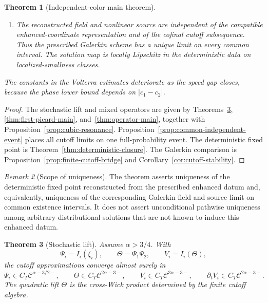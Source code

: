 \documentclass[10pt]{amsart}
\numberwithin{equation}{section}
\theoremstyle{plain}
\newtheorem{theorem}{Theorem}[section]
\theoremstyle{definition}
\theoremstyle{remark}
\newtheorem{remark}[theorem]{Remark}
\newcommand{\C}{\mathcal{C}}
\begin{document}
\begin{theorem}[Independent-color main theorem]
\begin{enumerate}[label=\textup{(\roman*)},leftmargin=2.2em]
\item The reconstructed field and nonlinear source are independent of the compatible enhanced-coordinate representation and of the cofinal cutoff subsequence.  Thus the prescribed Galerkin scheme has a unique limit on every common interval.  The solution map is locally Lipschitz in the deterministic data on localized-smallness classes.
\end{enumerate}
The constants in the Volterra estimates deteriorate as the speed gap closes, because the phase lower bound depends on \(|c_1-c_2|\).
\end{theorem}

\begin{proof}
The stochastic lift and mixed operators are given by Theorems~\ref{thm:stochastic-lift}, \ref{thm:first-picard-main}, and~\ref{thm:operator-main}, together with Proposition~\ref{prop:cubic-resonance}.  Proposition~\ref{prop:common-independent-event} places all cutoff limits on one full-probability event.  The deterministic fixed point is Theorem~\ref{thm:deterministic-closure}.  The Galerkin comparison is Proposition~\ref{prop:finite-cutoff-bridge} and Corollary~\ref{cor:cutoff-stability}.
\end{proof}

\begin{remark}[Scope of uniqueness]\label{rem:uniqueness-scope}
The theorem asserts uniqueness of the deterministic fixed point reconstructed from the prescribed enhanced datum and, equivalently, uniqueness of the corresponding Galerkin field and source limit on common existence intervals.  It does not assert unconditional pathwise uniqueness among arbitrary distributional solutions that are not known to induce this enhanced datum.
\end{remark}

\begin{theorem}[Stochastic lift]\label{thm:stochastic-lift}
Assume $\alpha>3/4$.  With
\[
        \Psi_i=I_i(\xi_i),
        \qquad
        \Theta=\Psi_1\Psi_2,
        \qquad
        V_i=I_i(\Theta),
\]
the cutoff approximations converge almost surely in
\begin{equation}\label{eq:stochastic-lift-paths}
        \Psi_i\in C_T\C^{\alpha-3/2-},
        \qquad
        \Theta\in C_T\C^{2\alpha-3-},
        \qquad
        V_i\in C_T\C^{3\alpha-3-},
        \qquad
        \partial_tV_i\in C_T\C^{2\alpha-3-}.
\end{equation}
The quadratic lift $\Theta$ is the cross-Wick product determined by the finite cutoff algebra.
\end{theorem}
\end{document}
